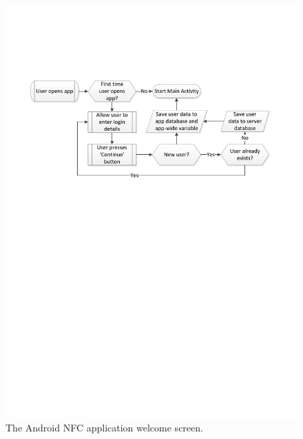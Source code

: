\begin{figure}
 \centering 
 \includegraphics[clip = true, trim = 0 480 0 130,
 scale=0.75]{welcome_screen_processflow}
 \caption{The Android NFC application welcome screen.}
 \label{fig:app-welcomescreen}
\end{figure}

